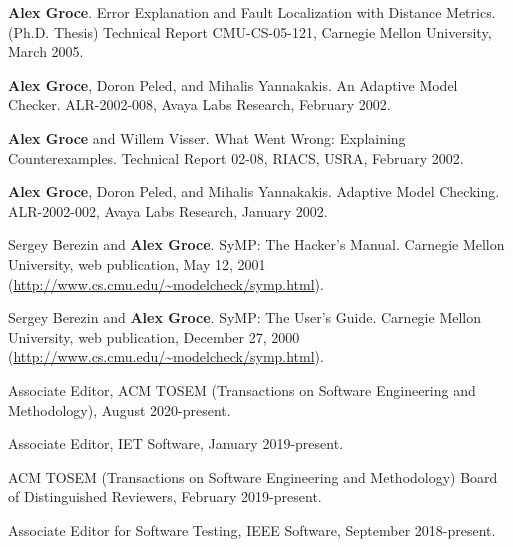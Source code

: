 \documentclass[ComputerScience]{vita}
\begin{document}
\begin{vita}
\begin{Technical Reports}
\item
{\bf Alex Groce}.
\newblock Error Explanation and Fault Localization with Distance Metrics.
\newblock (Ph.D. Thesis) Technical Report CMU-CS-05-121, Carnegie Mellon University, March 2005.

\item
{\bf Alex Groce}, Doron Peled, and Mihalis Yannakakis.
 An Adaptive Model Checker.
\newblock ALR-2002-008, Avaya Labs Research, February 2002.

\item
{\bf Alex Groce} and Willem Visser.
\newblock What Went Wrong: Explaining Counterexamples.
\newblock Technical Report 02-08, RIACS, USRA, February 2002.

\item
{\bf Alex Groce}, Doron Peled, and Mihalis Yannakakis.
\newblock Adaptive Model Checking.
\newblock ALR-2002-002, Avaya Labs Research, January 2002.

\item
Sergey Berezin and {\bf Alex Groce}.
\newblock SyMP: The Hacker's Manual.
\newblock Carnegie Mellon University, web publication, May 12, 2001 (\url{http://www.cs.cmu.edu/~modelcheck/symp.html}).

\item
Sergey Berezin and {\bf Alex Groce}.
\newblock SyMP: The User's Guide.
\newblock Carnegie Mellon University, web publication, December 27, 2000 (\url{http://www.cs.cmu.edu/~modelcheck/symp.html}).
\end{Technical Reports}

\begin{Professional Activities and Service}
  \item Associate Editor, ACM TOSEM (Transactions on Software Engineering and
    Methodology), 
    August 2020-present.
  
  \item Associate Editor, IET Software, 
    January 2019-present.

  \item ACM TOSEM (Transactions on Software Engineering and
    Methodology) Board of Distinguished Reviewers, February 2019-present.
  
  \item Associate Editor for Software Testing, IEEE Software,
    September 2018-present.


\end{Professional Activities and Service}
\end{vita}
\end{document}
